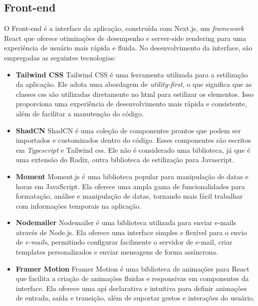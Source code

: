 \subsection{Front-end}
O Front-end é a interface da aplicação, construída com Next.js, um \textit{framework} React que oferece otimizações de desempenho e server-side rendering para uma experiência de usuário mais rápida e fluida. No desenvolvimento da interface, são empregadas as seguintes tecnologias:

\begin{itemize}
    \item \textbf{Tailwind CSS} \newline
Tailwind CSS é uma ferramenta utilizada para a estilização da aplicação. Ele adota uma abordagem de \textit{utility-first}, o que significa que as classes \ac{css} são utilizadas diretamente no \ac{html} para estilizar os elementos. Isso proporciona uma experiência de desenvolvimento mais rápida e consistente, além de facilitar a manutenção do código.

    \item \textbf{ShadCN} \newline
ShadCN é uma coleção de componentes prontos que podem ser importados e customizados dentro do código. Esses componentes são escritos em \textit{Typescript} e Tailwind \acs{css}. Ele não é considerado uma biblioteca, já que é uma extensão do Radix, outra biblioteca de estilização para Javascript.

    \item \textbf{Moment} \newline
Moment.js é uma biblioteca popular para manipulação de datas e horas em JavaScript. Ela oferece uma ampla gama de funcionalidades para formatação, análise e manipulação de datas, tornando mais fácil trabalhar com informações temporais na aplicação.

    \item \textbf{Nodemailer} \newline
Nodemailer é uma biblioteca utilizada para enviar e-mails através de Node.js. Ela oferece uma interface simples e flexível para o envio de \textit{e-mails}, permitindo configurar facilmente o servidor de e-mail, criar templates personalizados e enviar mensagens de forma assíncrona.

    \item \textbf{Framer Motion} \newline
Framer Motion é uma biblioteca de animações para React que facilita a criação de animações fluidas e responsivas em componentes da interface. Ela oferece uma \ac{api} declarativa e intuitiva para definir animações de entrada, saída e transição, além de suportar gestos e interações do usuário.


\end{itemize}
